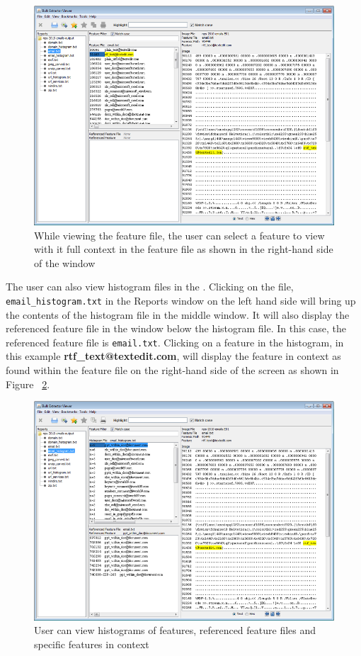 \documentclass[11pt]{article} %
\begin{document}
\begin{figure}
	\includegraphics[scale=.7]{viewerPics/emailFeatureFile.png}
	\caption{While viewing the feature file, the user can select a feature to view with it full context in the feature file as shown in the right-hand side of the window}
	\label{fig:emailFeatureFile}
\end{figure}

The user can also view histogram files in the \viewer. Clicking on the file, \texttt{email\_histogram.txt} in the Reports window on the left hand side will bring up the contents of the histogram file in the middle window. It will also display the referenced feature file in the window below the histogram file. In this case, the referenced feature file is \texttt{email.txt}. Clicking on a feature in the histogram, in this example \textbf{rtf\_text@textedit.com}, will display the feature in context as found within the feature file on the right-hand side of the screen as shown in Figure ~\ref{fig:emailHistogramView}.\\

\begin{figure}
	\includegraphics[scale=.70]{viewerPics/emailHistogramView.png}
	\caption{User can view histograms of features, referenced feature files and specific features in context}
	\label{fig:emailHistogramView}
\end{figure}
\end{document}
